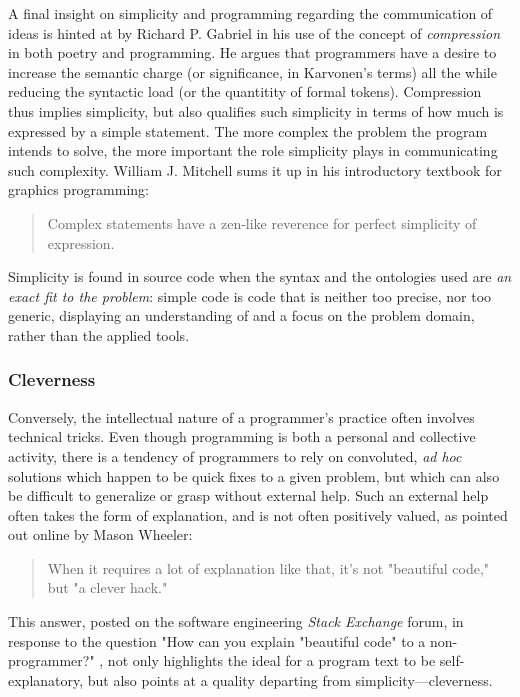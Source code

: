 A final insight on simplicity and programming regarding the communication of ideas is hinted at by Richard P. Gabriel in his use of the concept of \emph{compression} in both poetry and programming. He argues that programmers have a desire to increase the semantic charge (or significance, in Karvonen's terms) all the while reducing the syntactic load (or the quantitity of formal tokens). Compression thus implies simplicity, but also qualifies such simplicity in terms of how much is expressed by a simple statement. The more complex the problem the program intends to solve, the more important the role simplicity plays in communicating such complexity. William J. Mitchell sums it up in his introductory textbook for graphics programming:

\begin{quote}
  Complex statements have a zen-like reverence for perfect simplicity of expression. \citep{mitchell_art_1987}
\end{quote}

Simplicity is found in source code when the syntax and the ontologies used are \emph{an exact fit to the problem}: simple code is code that is neither too precise, nor too generic, displaying an understanding of and a focus on the problem domain, rather than the applied tools. 

\subsubsection{Cleverness}
\label{subsubsec:cleverness}

Conversely, the intellectual nature of a programmer's practice often involves technical tricks. Even though programming is both a personal and collective activity, there is a tendency of programmers to rely on convoluted, \emph{ad hoc} solutions which happen to be quick fixes to a given problem, but which can also be difficult to generalize or grasp without external help.
Such an external help often takes the form of explanation, and is not often positively valued, as pointed out online by Mason Wheeler:

\begin{quote}
  When it requires a lot of explanation like that, it's not "beautiful code," but "a clever hack." \citep{stackoverflow_how_2013}
\end{quote}

This answer, posted on the software engineering \emph{Stack Exchange} forum, in response to the question "How can you explain "beautiful code" to a non-programmer?" \citep{stackoverflow_how_2013}, not only highlights the ideal for a program text to be self-explanatory, but also points at a quality departing from simplicity—cleverness.

